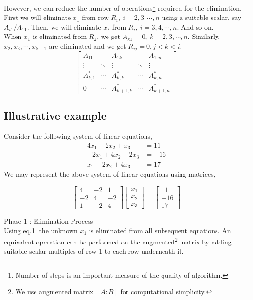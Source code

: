 	However, we can reduce the number of operations\footnote{Number of steps is an important measure of the quality of algorithm.} required for the elimination. First we will eliminate $x_1$ from row $R_i,\ i = 2,3,\cdots,n$ using a suitable scalar, say $A_{i1}/A_{11}$. Then, we will eliminate $x_2$ from $R_i,\ i = 3,4,\cdots,n$. And so on.\\

	When $x_1$ is eliminated from $R_2$, we get $A_{k1} = 0,\ k=2,3,\cdots,n$. Similarly, $x_2,x_3,\cdots,x_{k-1}$ are eliminated and we get $R_{ij} = 0, j < k < i$.
	\[ \begin{bmatrix} A_{11} & \cdots & A_{1k} & \cdots & A_{1,n} \\ \vdots & \ddots & \vdots & \ddots & \vdots \\ A_{k,1}^* & \cdots & A_{k,k}^* & \cdots & A_{k,n}^* \\ 0 & \cdots & A_{k+1,k}^* & \cdots & A_{k+1,n}^* \end{bmatrix}\]

\subsection{Illustrative example}
	Consider the following system of linear equations,
	\begin{align*}
		4x_1  - 2x_2  + x_3 & = 11 \\
		-2x_1  + 4x_2 - 2x_3 & = -16 \\
		x_1  - 2x_2 + 4x_3 & = 17 
	\end{align*} 
	We may represent the above system of linear equations using matrices,

	\[ \begin{bmatrix} 4 & -2 & 1 \\ -2 & 4 & -2 \\ 1 & -2 & 4 \end{bmatrix} \begin{bmatrix} x_1 \\ x_2 \\ x_3 \end{bmatrix} = \begin{bmatrix} 11 \\ -16 \\ 17 \end{bmatrix} \]

	Phase 1 : Elimination Process\\

	Using eq.1, the unknown $x_1$ is eliminated from all subsequent equations. An equivalent operation can be performed on the augmented\footnote{We use augmented matrix $[A:B]$ for computational simplicity.} matrix by adding suitable scalar multiples of row 1 to each row underneath it.

